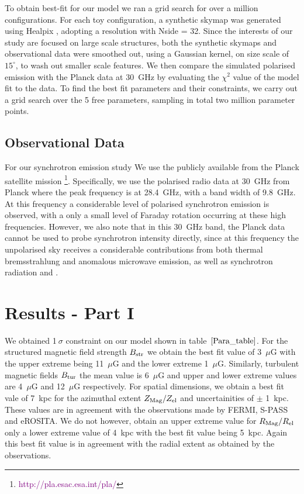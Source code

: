 \documentclass[12pt, a4 paper]{mnras}
\begin{document}

To obtain best-fit for our model we ran a grid search for over a million configurations. For each toy configuration, a synthetic skymap was generated using Healpix \cite{Healpix_2005}, adopting a resolution with Nside = 32. Since the interests of our study are focused on large scale structures, both the synthetic skymaps and observational data were smoothed out, using a Gaussian kernel, on size scale of $15^{\circ}$, to wash out smaller scale features. We then compare the simulated polarised emission with the Planck data at 30~GHz by evaluating the $\chi^{2}$ value of the model fit to the data. To find the best fit parameters and their constraints, we carry out a grid search over the 5 free parameters, sampling in total two million parameter points.


\subsection{Observational Data}
For our synchrotron emission study We use the publicly available from the Planck satellite mission \footnote{\textcolor{purple}{http://pla.esac.esa.int/pla/}}. Specifically, we use the polarised radio data at 30~GHz from Planck where the peak frequency is at 28.4~GHz, with a band width of 9.8~GHz. At this frequency a considerable level of polarised synchrotron emission is observed, with a only a small level of Faraday rotation occurring at these high frequencies. However, we also note that in this 30~GHz band, the Planck data cannot be used to probe synchrotron intensity directly, since at this frequency the unpolarised sky receives a considerable contributions from both thermal bremsstrahlung and anomalous microwave emission, as well as synchrotron radiation \cite{Planck_XIX} and \cite{Planck_XLII}. 

\section{Results - Part I}
\label{Results}
We obtained 1$~\sigma$ constraint on our model shown in table~$\ref{Para_table}$. For the structured magnetic field strength $B_{\rm str}$ we obtain the best fit value of 3~$\mu$G with the upper extreme being 11~$\mu$G
and the lower extreme 1~$\mu$G. Similarly, turbulent magnetic fields $B_{\rm tur}$ the mean value is 6~$\mu$G and upper and lower extreme values are 4~$\mu$G and 12~$\mu$G respectively. For spatial dimensions, we obtain a best fit vale of 7~kpc for the azimuthal extent $Z_{\rm Mag}/Z_{\rm el}$ and uncertainities of $\pm$ 1~kpc. These values are in agreement with the observations made by FERMI\cite{Su_2010}, S-PASS\cite{Carretti_2013} and eROSITA\cite{eROSITA}. We do not however, obtain an upper extreme value for $R_{\rm Mag}/R_{\rm el}$ only a lower extreme value of 4~kpc with the best fit value being 5~kpc. Again this best fit value is in agreement with the radial extent as obtained by the observations.
\end{document}
